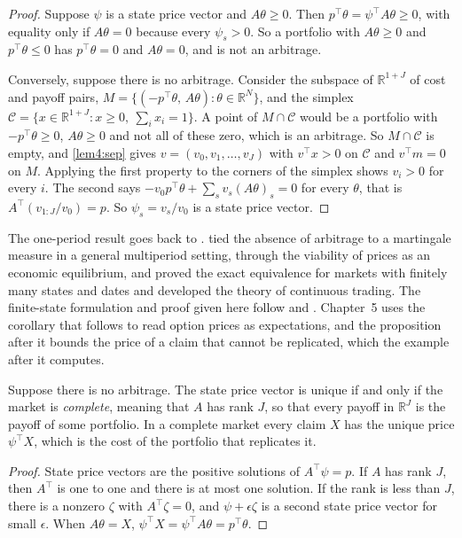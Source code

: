 \begin{chapterrefs}
\begin{proof}
Suppose $\psi$ is a state price vector and $A\theta\ge0$. Then
$p^\top\theta=\psi^\top A\theta\ge0$, with equality only if $A\theta=0$ because every $\psi_s>0$. So
a portfolio with $A\theta\ge0$ and $p^\top\theta\le0$ has $p^\top\theta=0$ and $A\theta=0$, and is not
an arbitrage.

Conversely, suppose there is no arbitrage. Consider the subspace of $\mathbb R^{1+J}$ of cost and payoff
pairs, $M=\{(-p^\top\theta,\,A\theta):\theta\in\mathbb R^N\}$, and the simplex
$\mathcal C=\{x\in\mathbb R^{1+J}:x\ge0,\ \sum_ix_i=1\}$. A point of $M\cap\mathcal C$ would be a portfolio with
$-p^\top\theta\ge0$, $A\theta\ge0$ and not all of these zero, which is an arbitrage. So $M\cap\mathcal C$ is
empty, and \cref{lem4:sep} gives $v=(v_0,v_1,\dots,v_J)$ with $v^\top x>0$ on $\mathcal C$ and $v^\top m=0$ on
$M$. Applying the first property to the corners of the simplex shows $v_i>0$ for every $i$. The
second says $-v_0p^\top\theta+\sum_sv_s(A\theta)_s=0$ for every $\theta$, that is
$A^\top(v_{1:J}/v_0)=p$. So $\psi_s=v_s/v_0$ is a state price vector.
\end{proof}

The one-period result goes back to \textcite{ross1978}. \textcite{harrison1979} tied the absence
of arbitrage to a martingale measure in a general multiperiod setting, through the viability of prices
as an economic equilibrium, and \textcite{harrison1981} proved the exact equivalence for markets with
finitely many states and dates and developed the theory of continuous trading. The finite-state
formulation and proof given here follow \textcite{follmer2016} and \textcite{duffie2001}. Chapter~5 uses the
corollary that follows to read option prices as expectations, and the proposition after it bounds
the price of a claim that cannot be replicated, which the example after it computes.

\begin{corollary}\label{cor4:complete}
Suppose there is no arbitrage. The state price vector is unique if and only if the market is
\emph{complete}, meaning that $A$ has rank $J$, so that every payoff in $\mathbb R^J$ is the payoff of some
portfolio. In a complete market every claim $X$ has the unique price $\psi^\top X$, which is the cost
of the portfolio that replicates it.
\end{corollary}

\begin{proof}
State price vectors are the positive solutions of $A^\top\psi=p$. If $A$ has rank $J$, then $A^\top$
is one to one and there is at most one solution. If the rank is less than $J$, there is a nonzero
$\zeta$ with $A^\top\zeta=0$, and $\psi+\epsilon\zeta$ is a second state price vector for small
$\epsilon$. When $A\theta=X$, $\psi^\top X=\psi^\top A\theta=p^\top\theta$.
\end{proof}


\end{chapterrefs}

